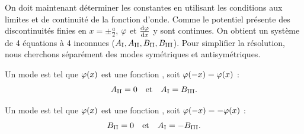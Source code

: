 \documentclass[12pt,fancy]{cours}
\begin{document}
 On doit maintenant déterminer les constantes en utilisant les conditions aux limites et de continuité de la fonction d'onde. Comme le potentiel présente des discontinuités finies en $x=\pm \frac{a}{2}$, $\varphi$ et $\frac{\mathrm{d}{\varphi}}{\mathrm{d}{x}}$ y sont continues.
On obtient un système de 4 équations à 4 inconnues ($A_{\rm{I}},A_{\rm{II}},B_{\rm{II}},B_{\rm{III}}$).
Pour simplifier la résolution, nous cherchons séparément des modes symétriques et antisymétriques.
\begin{liste}
  \item Un mode  est tel que $\varphi(x)$ est une fonction , soit $\varphi(-x) = \varphi(x)$ :
  \begin{equation}
    A_{\rm{II}}=0 \quad\text{et}\quad A_{\rm{I}}=B_{\rm{III}}.
  \end{equation}
  \item Un mode  est tel que $\varphi(x)$ est une fonction , soit $\varphi(-x) = -\varphi(x)$ :
  \begin{equation}
    B_{\rm{II}}=0 \quad\text{et}\quad A_{\rm{I}}=-B_{\rm{III}}.
  \end{equation}
\end{liste}
\end{document}
